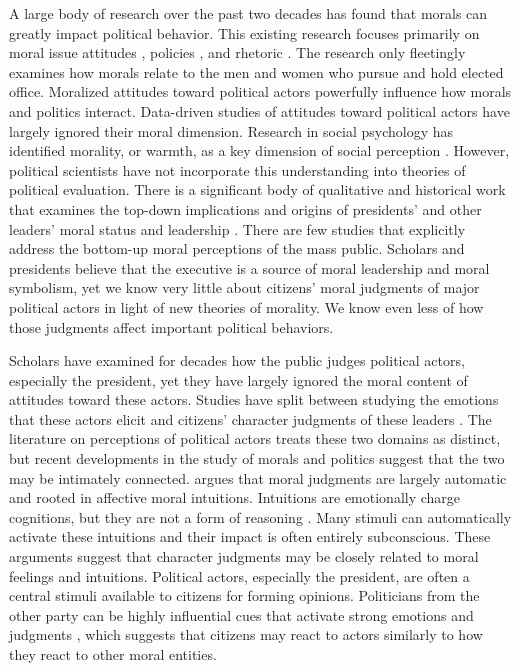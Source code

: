 A large body of research over the past two decades has found that morals can greatly impact political behavior. This existing research focuses primarily on moral issue attitudes \cite{Haidt2012}, policies \cite{Meier1994,MooneySchuldt2008}, and rhetoric \cite{Marietta2009,Grahametal2009}. The research only fleetingly examines how morals relate to the men and women who pursue and hold elected office. Moralized attitudes toward political actors powerfully influence how morals and politics interact. Data-driven studies of attitudes toward political actors have largely ignored their moral dimension. Research in social psychology has identified morality, or warmth, as a key dimension of social perception \cite{CuddyFiskeGlick2007}. However, political scientists have not incorporate this understanding into theories of political evaluation. There is a significant body of qualitative and historical work that examines the top-down implications and origins of presidents' and other leaders' moral status and leadership \cite{DaynesSussman2001,Denton2005,Hinckley1990,Kane2001,Olasky1999,Pfiffner2004}. There are few studies that explicitly address the bottom-up moral perceptions of the mass public. Scholars and presidents believe that the executive is a source of moral leadership and moral symbolism, yet we know very little about citizens' moral judgments of major political actors in light of new theories of morality. We know even less of how those judgments affect important political behaviors.

Scholars have examined for decades how the public judges political actors, especially the president, yet they have largely ignored the moral content of attitudes toward these actors. Studies have split between studying the emotions that these actors elicit \cite{HuddyFeldmanCassese2007,Marcus2000,Petersen2010} and citizens' character judgments of these leaders \cite{Funk1999,Goren2002,Goren2007,Hayes2005,Kinderetal1980,Newman2003,Newman2004}. The literature on perceptions of political actors treats these two domains as distinct, but recent developments in the study of morals and politics suggest that the two may be intimately connected.  argues that moral judgments are largely automatic and rooted in affective moral intuitions. Intuitions are emotionally charge cognitions, but they are not a form of reasoning \cite[814]{Haidt2001}. Many stimuli can automatically activate these intuitions and their impact is often entirely subconscious. These arguments suggest that character judgments may be closely related to moral feelings and intuitions. Political actors, especially the president, are often a central stimuli available to citizens for forming opinions. Politicians from the other party can be highly influential cues that activate strong emotions and judgments \cite{Nicholson2012}, which suggests that citizens may react to actors similarly to how they react to other moral entities.

